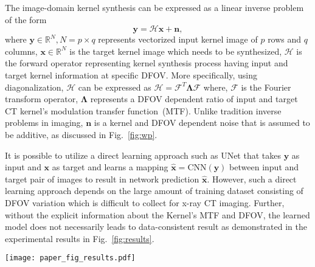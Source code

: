 \documentclass{article}
\def\x{{\bm{x}}}
\def\y{{\bm{y}}}
\def\n{{\bm n}}
\def\H{{ \bm{\mathcal H}}}
\def\F{{\bm{\mathcal F}}}
\begin{document}
The image-domain kernel synthesis can be expressed as a linear inverse problem of the form
\begin{equation}
	\label{eq:forward}
	\y =  \H  \x+ \n,
\end{equation}
where $\y \in \mathbb{R}^N, N=p \times q$ represents vectorized input kernel image of $p$ rows and $q$ columns, $\x \in \mathbb{R}^N$ is the target kernel image which needs to be synthesized, $\H$ is the forward operator representing kernel synthesis process having input and target kernel information at specific DFOV. More specifically, using diagonalization, $\H$ can be expressed as  $\H=\F^T \bm{\Lambda} \F$ where, $\F$ is the Fourier transform operator, $ \bm{\Lambda}$ represents a DFOV dependent ratio of input and target CT kernel's modulation transfer function~(MTF). Unlike tradition inverse problems in imaging, $\n$ is a kernel and DFOV dependent noise that is assumed to be additive, as discussed in Fig.~\ref{fig:wp}.  

It is possible to utilize a direct learning approach such as UNet that takes $\y$ as input and $\x$ as target and learns a mapping $\hat{\x}=\text{CNN}(\y)$ between input and target pair of images to result in network prediction $\hat{\x}$. However, such a direct learning approach depends on the large amount of training dataset consisting of DFOV variation which is difficult to collect for x-ray CT imaging. Further, without the explicit information about the Kernel's MTF and DFOV, the learned model does not necessarily leads to data-consistent result as demonstrated in the experimental results in Fig.~\ref{fig:results}. 

\begin{figure*}
	\centering
	\texttt{[image: paper\_fig\_results.pdf]}	
	\caption{The top row shows inference results at a DFOV of 5 cm, and the bottom row at a DFOV of 10 cm. The proposed method in~(c) produces sharper output compared to the direct learning  method in (b). The green circle highlights artifacts (in zoomed version) in the DFOV 5 cm output of the direct learning method. The red arrow indicates hallucinations in the direct learning method, whereas the proposed method retains the structure well. }
	\label{fig:results}
\end{figure*}
\end{document}
